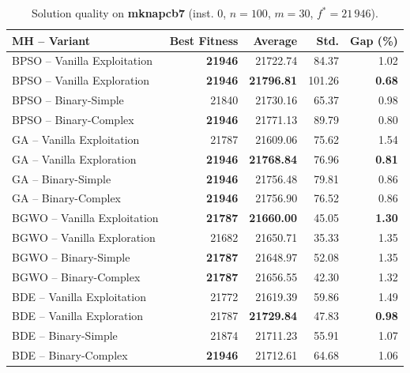\begin{table}[htbp]
  \centering
  \small
  \caption{Solution quality on \textbf{mknapcb7} (inst. 0, $n=100$, $m=30$, $f^*=21\,946$).}
  \label{tab:calidad_mknapcb7_0}
  \begin{tabular}{lrrrr}
    \toprule
    \textbf{MH -- Variant} &
    \textbf{Best Fitness} &
    \textbf{Average} &
    \textbf{Std.} &
    \textbf{Gap (\%)} \\
    \midrule
    BPSO -- Vanilla Exploitation & \textbf{21946} &         21722.74 &  84.37 &         1.02 \\
    BPSO -- Vanilla Exploration  & \textbf{21946} & \textbf{21796.81} & 101.26 & \textbf{0.68} \\
    BPSO -- Binary-Simple        &          21840 &         21730.16 &  65.37 &         0.98 \\
    BPSO -- Binary-Complex       & \textbf{21946} &         21771.13 &  89.79 &         0.80 \\
    \midrule
    GA -- Vanilla Exploitation   &          21787 &         21609.06 &  75.62 &         1.54 \\
    GA -- Vanilla Exploration    & \textbf{21946} & \textbf{21768.84} &  76.96 & \textbf{0.81} \\
    GA -- Binary-Simple          & \textbf{21946} &         21756.48 &  79.81 &         0.86 \\
    GA -- Binary-Complex         & \textbf{21946} &         21756.90 &  76.52 &         0.86 \\
    \midrule
    BGWO -- Vanilla Exploitation & \textbf{21787} & \textbf{21660.00} &  45.05 & \textbf{1.30} \\
    BGWO -- Vanilla Exploration  &          21682 &         21650.71 &  35.33 &         1.35 \\
    BGWO -- Binary-Simple        & \textbf{21787} &         21648.97 &  52.08 &         1.35 \\
    BGWO -- Binary-Complex       & \textbf{21787} &         21656.55 &  42.30 &         1.32 \\
    \midrule
    BDE -- Vanilla Exploitation  &          21772 &         21619.39 &  59.86 &         1.49 \\
    BDE -- Vanilla Exploration   &          21787 & \textbf{21729.84} &  47.83 & \textbf{0.98} \\
    BDE -- Binary-Simple         &          21874 &         21711.23 &  55.91 &         1.07 \\
    BDE -- Binary-Complex        & \textbf{21946} &         21712.61 &  64.68 &         1.06 \\
    \bottomrule
  \end{tabular}
\end{table}

